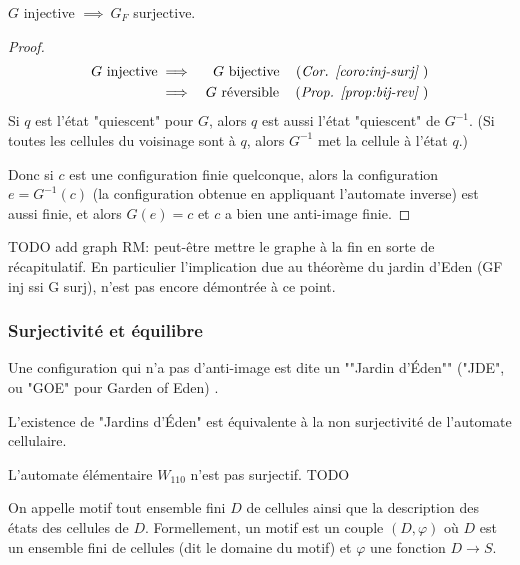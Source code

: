 \begin{coro}
	$G$ injective $\implies \ G_F$ surjective.
\end{coro}


\begin{proof}
	\begin{eqnarray*}
		G \text{ injective} &\implies& G \text{ bijective} \quad\left(\textit{Cor. \ref{coro:inj-surj} }\right)\\
		&\implies& G \text{ réversible} \quad\left(\textit{Prop. \ref{prop:bij-rev} }\right)
	\end{eqnarray*}
	Si $q$ est l'état "quiescent" pour $G$, alors $q$ est aussi l'état "quiescent" de $G^{-1}$.
	(Si toutes les cellules du voisinage sont à $q$, alors $G^{-1}$ met la cellule à l'état $q$.)

	Donc si $c$ est une configuration finie quelconque,  alors la configuration $e = G^{-1}(c)$ (la configuration obtenue en appliquant
	l'automate inverse) est aussi finie, et alors $G(e) = c$ et $c$ a bien une anti-image finie.
\end{proof}

TODO add graph
RM: peut-être mettre le graphe à la fin en sorte de récapitulatif. En particulier l'implication due au  théorème du jardin
d'Eden (GF inj ssi  G surj), n'est pas encore démontrée à ce point.


\subsubsection{Surjectivité et équilibre}
\begin{definition}
	Une configuration qui n'a pas d'anti-image est dite un ""Jardin d'Éden"" ("JDE", ou "GOE" pour Garden of Eden) .
\end{definition}

\begin{remarque}
	L'existence de "Jardins d'Éden" est équivalente à la non surjectivité de l'automate cellulaire.
\end{remarque}

\begin{exemple}
	L'automate élémentaire $W_{110}$ n'est pas surjectif. TODO
\end{exemple}


\begin{definition}
	On appelle motif tout ensemble fini $D$ de cellules ainsi que la description des états des cellules de $D$. Formellement, un motif est un
	couple $(D, \varphi)$ où $D$ est un ensemble fini de cellules (dit le domaine du motif) et $\varphi$ une fonction $D \to S$.
\end{definition}


